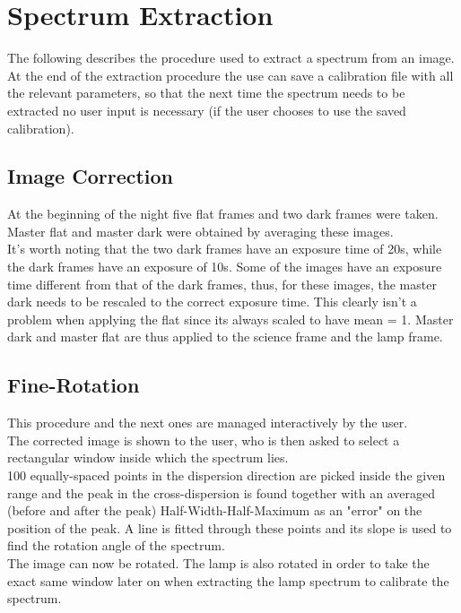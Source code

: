 \documentclass[a4paper]{article}
\begin{document}
	\section{Spectrum Extraction}
	\begin{multicols}{2}
		The following describes the procedure used to extract a spectrum from an image.\\
		At the end of the extraction procedure the use can save a calibration file with all the relevant parameters, so that the next time the spectrum needs to be extracted no user input is necessary (if the user chooses to use the saved calibration).
		
		\subsection{Image Correction}
			At the beginning of the night five flat frames and two dark frames were taken. Master flat and master dark were obtained by averaging these images.\\
			It's worth noting that the two dark frames have an exposure time of 20s, while the dark frames have an exposure of 10s. Some of the images have an exposure time different from that of the dark frames, thus, for these images, the master dark needs to be rescaled to the correct exposure time. This clearly isn't a problem when applying the flat since its always scaled to have mean = 1.
			Master dark and master flat are thus applied to the science frame and the lamp frame.\\
		
		\subsection{Fine-Rotation}
			This procedure and the next ones are managed interactively by the user.\\
			
			The corrected image is shown to the user, who is then asked to select a rectangular window inside which the spectrum lies.\\
			100 equally-spaced points in the dispersion direction are picked inside the given range and the peak in the cross-dispersion is found together with an averaged (before and after the peak) Half-Width-Half-Maximum as an "error" on the position of the peak. A line is fitted through these points and its slope is used to find the rotation angle of the spectrum.\\
			
			The image can now be rotated. The lamp is also rotated in order to take the exact same window later on when extracting the lamp spectrum to calibrate the spectrum.\\
		

\end{multicols}
\end{document}
